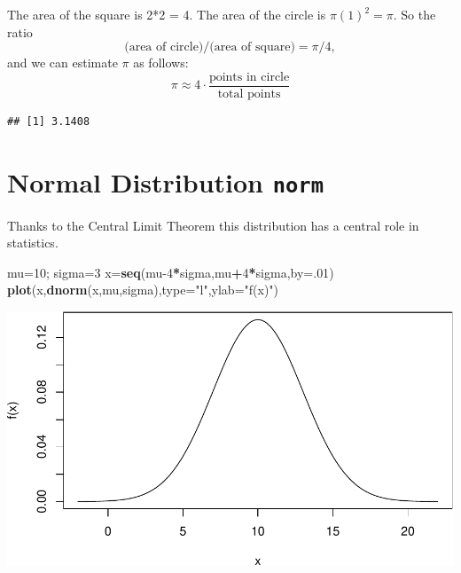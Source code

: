\documentclass[
]{book}
\newenvironment{Shaded}{\begin{snugshade}}{\end{snugshade}}
\newcommand{\AttributeTok}[1]{\textcolor[rgb]{0.13,0.29,0.53}{#1}}
\newcommand{\CommentTok}[1]{\textcolor[rgb]{0.56,0.35,0.01}{\textit{#1}}}
\newcommand{\DecValTok}[1]{\textcolor[rgb]{0.00,0.00,0.81}{#1}}
\newcommand{\FunctionTok}[1]{\textcolor[rgb]{0.13,0.29,0.53}{\textbf{#1}}}
\newcommand{\NormalTok}[1]{#1}
\newcommand{\OtherTok}[1]{\textcolor[rgb]{0.56,0.35,0.01}{#1}}
\newcommand{\SpecialCharTok}[1]{\textcolor[rgb]{0.81,0.36,0.00}{\textbf{#1}}}
\newcommand{\StringTok}[1]{\textcolor[rgb]{0.31,0.60,0.02}{#1}}
\theoremstyle{definition}
\theoremstyle{definition}
\theoremstyle{definition}
\theoremstyle{definition}
\theoremstyle{remark}
\begin{document}
The area of the square is 2*2 = 4.
The area of the circle is \(\pi (1)^2 = \pi.\) So the ratio\\
\[\text{(area of circle)/(area of square)}=\pi/4,\]
and we can estimate \(\pi\) as follows:
\[\pi \approx 4\cdot \frac{\text{points in circle}}{\text{total points}}\]

\begin{Shaded}
\end{Shaded}

\begin{verbatim}
## [1] 3.1408
\end{verbatim}

\section{\texorpdfstring{Normal Distribution \texttt{norm}}{Normal Distribution norm}}\label{normalR}

Thanks to the Central Limit Theorem this distribution has a central role in statistics.

\begin{Shaded}
\begin{Highlighting}[]
\NormalTok{mu}\OtherTok{=}\DecValTok{10}\NormalTok{; sigma}\OtherTok{=}\DecValTok{3}
\NormalTok{x}\OtherTok{=}\FunctionTok{seq}\NormalTok{(mu}\DecValTok{{-}4}\SpecialCharTok{*}\NormalTok{sigma,mu}\SpecialCharTok{+}\DecValTok{4}\SpecialCharTok{*}\NormalTok{sigma,}\AttributeTok{by=}\NormalTok{.}\DecValTok{01}\NormalTok{)}
\FunctionTok{plot}\NormalTok{(x,}\FunctionTok{dnorm}\NormalTok{(x,mu,sigma),}\AttributeTok{type=}\StringTok{"l"}\NormalTok{,}\AttributeTok{ylab=}\StringTok{"f(x)"}\NormalTok{)}
\end{Highlighting}
\end{Shaded}

\includegraphics{math340-notes_files/figure-latex/unnamed-chunk-171-1.pdf}
\end{document}
